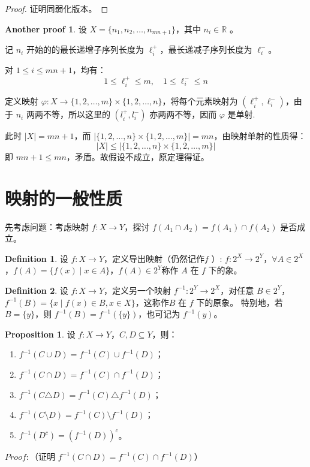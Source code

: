 \documentclass[oneside]{book}
\theoremstyle{definition}
\newtheorem{proposition}{Proposition}[section]
\newtheorem{definition}{Definition}[section]
\newtheorem*{ap}{Another proof}
\begin{document}
	\begin{proof}
		证明同弱化版本。
	\end{proof}
	\begin{ap}
		设 \( X = \{n_1, n_2, \dots, n_{mn+1}\} \)，其中 \( n_i \in \mathbb{R} \) 。
		
		记 \( n_i \) 开始的的最长递增子序列长度为 \( \ell_i^+ \)，最长递减子序列长度为 \( \ell_i^- \)。
		
		对 \( 1 \leq i \leq mn + 1 \)，均有：
		\[
		1 \leq \ell_i^+ \leq m, \quad 1 \leq \ell_i^- \leq n
		\]
		
		定义映射 \( \varphi: X \to \{1,2,\dots,m\} \times \{1,2,\dots,n\} \)，将每个元素映射为 \( (\ell_i^+, \ell_i^-) \)，由于 \(n_i\) 两两不等，所以这里的 \((l_i^+,l_i^-)\) 亦两两不等，因而 \( \varphi \) 是单射.
		
		此时 \( |X| = mn + 1 \)，而 \( |\{1,2,\dots,n\} \times \{1,2,\dots,m\}| = mn \)，由映射单射的性质得：
		\[
		|X| \leq |\{1,2,\dots,n\} \times \{1,2,\dots,m\}|
		\]
		即 \( mn + 1 \leq mn \)，矛盾。故假设不成立，原定理得证。
	\end{ap}
	\section{映射的一般性质}
	先考虑问题：考虑映射 \( f: X \to Y \)，探讨 \( f(A_1 \cap A_2) = f(A_1) \cap f(A_2) \) 是否成立。
	
	\begin{definition}
		设 \( f: X \to Y \)，定义导出映射（仍然记作\( f \) ）: \( f: 2^X \to 2^Y \)，\( \forall  A \in 2^X \)，\( f(A) = \{ f(x) \mid x \in A \} \)，\( f(A) \in 2^Y\)称作 \( A \) 在 \( f \) 下的象。
	\end{definition}
	
	\begin{definition}
		设 \( f: X \to Y \)，定义另一个映射 \( f^{-1}: 2^Y \to 2^X \)，对任意 \( B \in 2^Y \)，\( f^{-1}(B) = \{ x \mid f(x) \in B, x \in X \} \)，这称作\( B \) 在 \( f \) 下的原象。
	特别地，若 \( B = \{ y \} \)，则 \( f^{-1}(B) = f^{-1}(\{ y \}) \)，也可记为 \( f^{-1}(y) \)。
	\end{definition}
	
	\begin{proposition}
		设 \( f: X \to Y \)，\( C, D \subseteq Y \)，则：
		\begin{enumerate}
			\item \( f^{-1}(C \cup D) = f^{-1}(C) \cup f^{-1}(D) \)；
			\item \( f^{-1}(C \cap D) = f^{-1}(C) \cap f^{-1}(D) \)；
			\item \( f^{-1}(C \triangle D) = f^{-1}(C) \triangle f^{-1}(D) \)；
			\item \( f^{-1}(C \setminus D) = f^{-1}(C) \setminus f^{-1}(D) \)；
			\item \( f^{-1}(D^c) = (f^{-1}(D))^c \)。
		\end{enumerate}
	\end{proposition}
	$Proof:$（证明 \( f^{-1}(C \cap D) = f^{-1}(C) \cap f^{-1}(D) \)）
	
\end{document}
